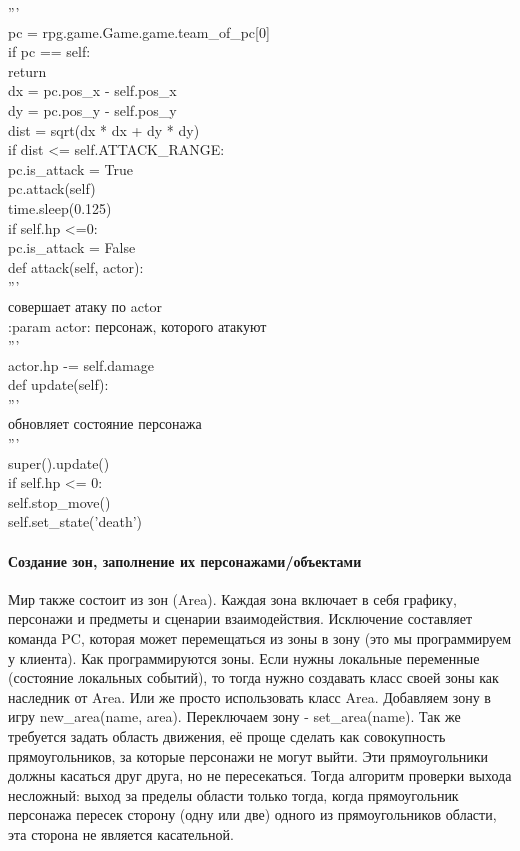'''\\
pc = rpg.game.Game.game.team\_of\_pc[0]\\
if pc == self:\\
return\\
dx = pc.pos\_x - self.pos\_x\\
dy = pc.pos\_y - self.pos\_y\\
dist = sqrt(dx * dx + dy * dy)\\
if dist <= self.ATTACK\_RANGE:\\
pc.is\_attack = True\\
pc.attack(self)\\
time.sleep(0.125)\\
if self.hp <=0:\\
pc.is\_attack = False\\

def attack(self, actor):\\
'''\\
совершает атаку по actor\\

:param actor: персонаж, которого атакуют\\
'''\\
actor.hp -= self.damage\\
def update(self):\\
'''\\
обновляет состояние персонажа\\

'''\\
super().update()\\
if self.hp <= 0:\\
self.stop\_move()\\
self.set\_state('death')\\


\paragraph{Создание зон, заполнение их персонажами/объектами}
Мир также состоит из зон (Area). Каждая зона включает в себя графику, персонажи и предметы и сценарии взаимодействия. Исключение составляет команда PC, которая может перемещаться из зоны в зону (это мы программируем у клиента). Как программируются зоны. Если нужны локальные переменные (состояние локальных событий), то тогда нужно создавать класс своей зоны как наследник от Area. Или же просто использовать класс Area. Добавляем зону в игру new\_area(name, area). Переключаем зону - set\_area(name). Так же требуется задать область движения, её проще сделать как совокупность прямоугольников, за которые персонажи не могут выйти. Эти прямоугольники должны касаться друг друга, но не пересекаться. Тогда алгоритм проверки выхода несложный: выход за пределы области только тогда, когда прямоугольник персонажа пересек сторону (одну или две) одного из прямоугольников области, эта сторона не является касательной.

